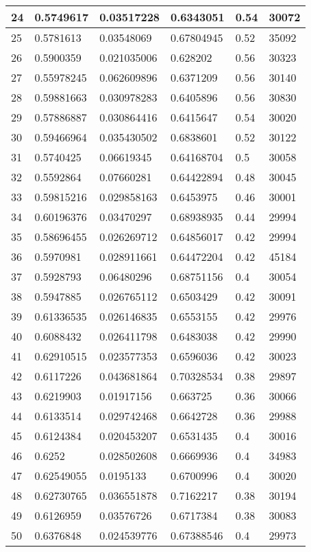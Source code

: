 \begin{longtable}{|l|l|l|l|l|l|}
24 & 0.5749617 & 0.03517228 & 0.6343051 & 0.54 & 30072 \\ \hline 
25 & 0.5781613 & 0.03548069 & 0.67804945 & 0.52 & 35092 \\ \hline 
26 & 0.5900359 & 0.021035006 & 0.628202 & 0.56 & 30323 \\ \hline 
27 & 0.55978245 & 0.062609896 & 0.6371209 & 0.56 & 30140 \\ \hline 
28 & 0.59881663 & 0.030978283 & 0.6405896 & 0.56 & 30830 \\ \hline 
29 & 0.57886887 & 0.030864416 & 0.6415647 & 0.54 & 30020 \\ \hline 
30 & 0.59466964 & 0.035430502 & 0.6838601 & 0.52 & 30122 \\ \hline 
31 & 0.5740425 & 0.06619345 & 0.64168704 & 0.5 & 30058 \\ \hline 
32 & 0.5592864 & 0.07660281 & 0.64422894 & 0.48 & 30045 \\ \hline 
33 & 0.59815216 & 0.029858163 & 0.6453975 & 0.46 & 30001 \\ \hline 
34 & 0.60196376 & 0.03470297 & 0.68938935 & 0.44 & 29994 \\ \hline 
35 & 0.58696455 & 0.026269712 & 0.64856017 & 0.42 & 29994 \\ \hline 
36 & 0.5970981 & 0.028911661 & 0.64472204 & 0.42 & 45184 \\ \hline 
37 & 0.5928793 & 0.06480296 & 0.68751156 & 0.4 & 30054 \\ \hline 
38 & 0.5947885 & 0.026765112 & 0.6503429 & 0.42 & 30091 \\ \hline 
39 & 0.61336535 & 0.026146835 & 0.6553155 & 0.42 & 29976 \\ \hline 
40 & 0.6088432 & 0.026411798 & 0.6483038 & 0.42 & 29990 \\ \hline 
41 & 0.62910515 & 0.023577353 & 0.6596036 & 0.42 & 30023 \\ \hline 
42 & 0.6117226 & 0.043681864 & 0.70328534 & 0.38 & 29897 \\ \hline 
43 & 0.6219903 & 0.01917156 & 0.663725 & 0.36 & 30066 \\ \hline 
44 & 0.6133514 & 0.029742468 & 0.6642728 & 0.36 & 29988 \\ \hline 
45 & 0.6124384 & 0.020453207 & 0.6531435 & 0.4 & 30016 \\ \hline 
46 & 0.6252 & 0.028502608 & 0.6669936 & 0.4 & 34983 \\ \hline 
47 & 0.62549055 & 0.0195133 & 0.6700996 & 0.4 & 30020 \\ \hline 
48 & 0.62730765 & 0.036551878 & 0.7162217 & 0.38 & 30194 \\ \hline 
49 & 0.6126959 & 0.03576726 & 0.6717384 & 0.38 & 30083 \\ \hline 
50 & 0.6376848 & 0.024539776 & 0.67388546 & 0.4 & 29973 \\ \hline 
\end{longtable}